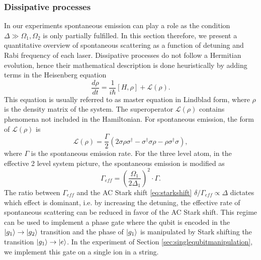 \subsubsection{Dissipative processes}
\label{sec:dissipation}
In our experiments spontaneous emission can play a role as the condition $\Delta \gg \Omega_1,\Omega_2$ is only partially fulfilled. In this section therefore, we present a quantitative overview of spontaneous scattering as a function of detuning and Rabi frequency of each laser. Dissipative processes do not follow a Hermitian evolution, hence their mathematical description is done heuristically by adding terms in the Heisenberg equation
\begin{equation}
\label{masterequation}
\frac{d\rho}{dt} = \frac{1}{i\hbar}[H,\rho] + \mathcal{L}(\rho).
\end{equation}
This equation is usually referred to as master equation in Lindblad form, where $\rho$ is the density matrix of the system. The superoperator
$\mathcal{L}(\rho)$ contains phenomena not included in the Hamiltonian. For spontaneous emission, the form of $\mathcal{L}(\rho)$ is \cite{quantumnoise}
\begin{equation}
\mathcal{L}(\rho) = \frac{\Gamma}{2}(2\sigma \rho \sigma^\dagger -\sigma^\dagger\sigma \rho - \rho \sigma^\dagger \sigma),
\end{equation}
where $\Gamma$ is the spontaneous emission rate.
For the three level atom, in the effective 2 level system picture, the spontaneous emission is modified as \cite{russo}
\begin{equation}
\label{eq:gammaeff}
\Gamma_{eff} = \left(\frac{\Omega_1}{2 \Delta_1}\right)^2 \cdot \Gamma.
\end{equation}
The ratio between $\Gamma_{eff}$ and the AC Stark shift \eqref{eq:starkshift} $\delta/\Gamma_{eff}\propto \Delta$ dictates which effect is dominant, i.e. by increasing the detuning, the effective rate of spontaneous scattering can be reduced in favor of the AC Stark shift. This regime can be used to implement a phase gate where the qubit is encoded in the $\ket{g_1}\to\ket{g_2}$ transition and the phase of $\ket{g_1}$ is manipulated by Stark shifting the transition $\ket{g_1}\to \ket{e}$. In the experiment of Section \ref{sec:singlequbitmanipulation}, we implement this gate on a single ion in a string.


